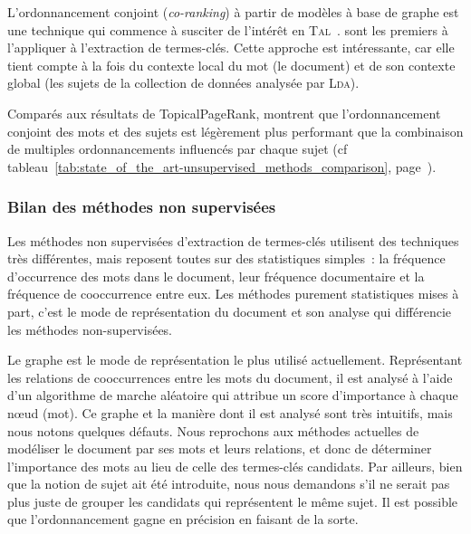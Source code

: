         L'ordonnancement conjoint (\textit{co-ranking}) à partir de modèles à
        base de graphe est une technique qui commence à susciter de l'intérêt en
        \textsc{Tal}~\cite{wan2011corankingsummarization,yan2012corankingtweetrecommendation,liu2014corankingopinionmining}.
         sont les premiers à l'appliquer à
        l'extraction de termes-clés. Cette approche est intéressante, car elle
        tient compte à la fois du contexte local du mot (le document) et de son
        contexte global (les sujets de la collection de données analysée par
        \textsc{Lda}).

        Comparés aux résultats de TopicalPageRank,
         montrent que l'ordonnancement
        conjoint des mots et des sujets est légèrement plus performant que la
        combinaison de multiples ordonnancements influencés par chaque sujet
        (cf tableau~\ref{tab:state_of_the_art-unsupervised_methods_comparison},
        page~\pageref{tab:state_of_the_art-unsupervised_methods_comparison}).

      \subsubsection{Bilan des méthodes non supervisées}
      \label{subsubsec:main-state_of_the_art-automatic_keyphrase_extraction-unsupervised_keyphrase_extraction-bilan}
        Les méthodes non supervisées d'extraction de termes-clés utilisent des
        techniques très différentes, mais reposent toutes sur des statistiques
        simples~: la fréquence d'occurrence des mots dans le document, leur
        fréquence documentaire et la fréquence de cooccurrence entre eux. Les
        méthodes purement statistiques mises à part, c'est le mode de
        représentation du document et son analyse qui différencie les méthodes
        non-supervisées.
        
        Le graphe est le mode de représentation le plus utilisé actuellement.
        Représentant les relations de cooccurrences entre les mots du document,
        il est analysé à l'aide d'un algorithme de marche aléatoire qui attribue
        un score d'importance à chaque n\oe{}ud (mot). Ce graphe et la manière
        dont il est analysé sont très intuitifs, mais nous notons quelques
        défauts. Nous reprochons aux méthodes actuelles de modéliser le document
        par ses mots et leurs relations, et donc de déterminer l'importance des
        mots au lieu de celle des termes-clés candidats. Par ailleurs, bien que
        la notion de sujet ait été introduite, nous nous demandons s'il ne
        serait pas plus juste de grouper les candidats qui représentent le même
        sujet. Il est possible que l'ordonnancement gagne en précision en
        faisant de la sorte.

